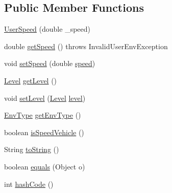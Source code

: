 \subsection*{\-Public \-Member \-Functions}
\begin{DoxyCompactItemize}
\item 
\hyperlink{classlab_1_1davidahn_1_1appshuttle_1_1collect_1_1env_1_1_user_speed_a982d9aa83bb15bb007367f933411db61}{\-User\-Speed} (double \-\_\-speed)
\item 
double \hyperlink{classlab_1_1davidahn_1_1appshuttle_1_1collect_1_1env_1_1_user_speed_acbc49818b9df846b866e74161ff1d8ab}{get\-Speed} ()  throws Invalid\-User\-Env\-Exception 
\item 
void \hyperlink{classlab_1_1davidahn_1_1appshuttle_1_1collect_1_1env_1_1_user_speed_a2263b316e9b6f8e5c483aec7762b0782}{set\-Speed} (double \hyperlink{classlab_1_1davidahn_1_1appshuttle_1_1collect_1_1env_1_1_user_speed_a94e3e0a8a429b8ac1081ddb024d583ca}{speed})
\item 
\hyperlink{enumlab_1_1davidahn_1_1appshuttle_1_1collect_1_1env_1_1_user_speed_1_1_level}{\-Level} \hyperlink{classlab_1_1davidahn_1_1appshuttle_1_1collect_1_1env_1_1_user_speed_adbaecfee8c115d3d49d4cdf353888a3d}{get\-Level} ()
\item 
void \hyperlink{classlab_1_1davidahn_1_1appshuttle_1_1collect_1_1env_1_1_user_speed_a02a8949fa9c54ac9f30c035f57c38789}{set\-Level} (\hyperlink{enumlab_1_1davidahn_1_1appshuttle_1_1collect_1_1env_1_1_user_speed_1_1_level}{\-Level} \hyperlink{classlab_1_1davidahn_1_1appshuttle_1_1collect_1_1env_1_1_user_speed_a867afee6398c3a0b5b7a938061878b1d}{level})
\item 
\hyperlink{enumlab_1_1davidahn_1_1appshuttle_1_1collect_1_1env_1_1_env_type}{\-Env\-Type} \hyperlink{classlab_1_1davidahn_1_1appshuttle_1_1collect_1_1env_1_1_user_speed_af8829cca768ac86cb5ee7b0378a59733}{get\-Env\-Type} ()
\item 
boolean \hyperlink{classlab_1_1davidahn_1_1appshuttle_1_1collect_1_1env_1_1_user_speed_a27c57ffd022022f6e7cdfec2a933f149}{is\-Speed\-Vehicle} ()
\item 
\-String \hyperlink{classlab_1_1davidahn_1_1appshuttle_1_1collect_1_1env_1_1_user_speed_a64815731d5fdff97bcb0eceda4afbf1b}{to\-String} ()
\item 
boolean \hyperlink{classlab_1_1davidahn_1_1appshuttle_1_1collect_1_1env_1_1_user_speed_a6ac16897d2ed4602533011eb2fd6b9a6}{equals} (\-Object o)
\item 
int \hyperlink{classlab_1_1davidahn_1_1appshuttle_1_1collect_1_1env_1_1_user_speed_a66cd084b24550a67d94d9b1f59ffbace}{hash\-Code} ()
\end{DoxyCompactItemize}

